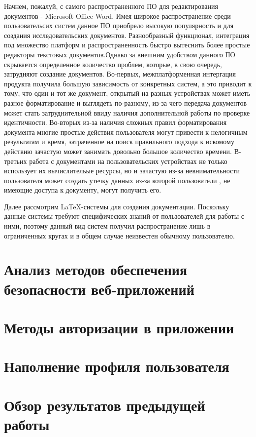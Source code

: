 Начнем, пожалуй, с самого распространенного ПО для редактирования документов - Microsoft Office Word. Имея широкое распространение среди пользовательсих систем данное ПО приобрело высокую популярность и для создания исследовательских документов. Разнообразный функционал, интеграция под множество платформ и распространенность быстро вытеснить более простые редакторы текстовых документов.Однако за внешним удобством данного ПО скрывается определенное количество проблем, которые, в свою очередь, затрудняют создание документов. Во-первых, межплатформенная интергация продукта получила большую зависимость от конкретных систем, а это приводит к тому, что один и тот же документ, открытый на разных устройствах может иметь разное форматирование и выглядеть по-разному, из-за чего передача  документов может стать затруднительной ввиду наличия дополнительной работы по проверке идентичности. Во-вторых из-за наличия сложных правил форматирования документа многие простые действия пользователя могут привести к нелогичным результатам и время, затраченное на поиск правильного подхода к искомому действию зачастую может занимать довольно большое количество времени. В-третьих работа с документами на пользовательских устройствах не только использует их вычислительые ресурсы, но и зачастую из-за невнимательности пользователя может создать утечку данных из-за которой пользователи , не имеющие доступа к документу, могут получить его.

Далее рассмотрим LaTeX-системы для создания документации. Поскольку данные системы требуют специфических знаний от пользователей для работы с ними, поэтому данный вид систем получил распространение лишь в ограниченных кругах и в общем случае неизвестен обычному пользователю.

\section{Анализ методов обеспечения безопасности веб-приложений}

\section{Методы авторизации в приложении}

\section{Наполнение профиля пользователя}




\section{Обзор результатов предыдущей работы}

